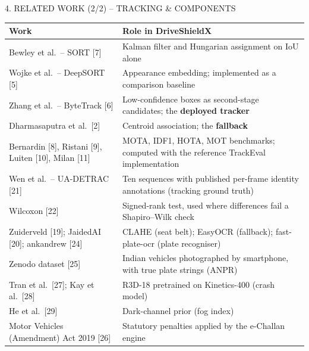 \documentclass[aspectratio=169,10pt,t]{beamer}
\begin{document}
\begin{frame}{4. RELATED WORK (2/2) -- TRACKING \& COMPONENTS}
\scriptsize
\centering
\begin{tabularx}{\textwidth}{@{}L{0.33\textwidth}Y@{}}
\toprule
\textbf{Work} & \textbf{Role in DriveShieldX}\\
\midrule
Bewley et al.\ -- SORT [7]          & Kalman filter and Hungarian assignment on IoU alone\\
Wojke et al.\ -- DeepSORT [5]       & Appearance embedding; implemented as a comparison baseline\\
Zhang et al.\ -- ByteTrack [6]      & Low-confidence boxes as second-stage candidates; the \textbf{deployed tracker}\\
Dharmasaputra et al.\ [2]           & Centroid association; the \textbf{fallback}\\
Bernardin [8], Ristani [9], Luiten [10], Milan [11] & MOTA, IDF1, HOTA, MOT benchmarks; computed with the reference TrackEval implementation\\
Wen et al.\ -- UA-DETRAC [21]       & Ten sequences with published per-frame identity annotations (tracking ground truth)\\
Wilcoxon [22]                       & Signed-rank test, used where differences fail a Shapiro--Wilk check\\
Zuiderveld [19]; JaidedAI [20]; ankandrew [24] & CLAHE (seat belt); EasyOCR (fallback); fast-plate-ocr (plate recogniser)\\
Zenodo dataset [25]                 & Indian vehicles photographed by smartphone, with true plate strings (ANPR)\\
Tran et al.\ [27]; Kay et al.\ [28] & R3D-18 pretrained on Kinetics-400 (crash model)\\
He et al.\ [29]                     & Dark-channel prior (fog index)\\
Motor Vehicles (Amendment) Act 2019 [26] & Statutory penalties applied by the e-Challan engine\\
\bottomrule
\end{tabularx}
\end{frame}
\end{document}
